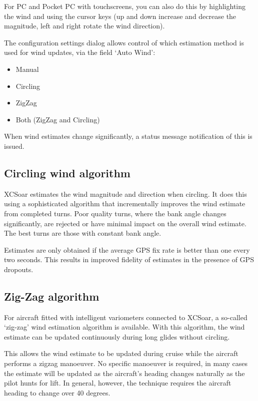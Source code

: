 For PC and Pocket PC with touchscreens, you can
also do this by highlighting the wind {\InfoBox} and using the cursor
keys (up and down increase and decrease the magnitude, left and right
rotate the wind direction).

The configuration  settings dialog allows control of which
estimation method is used for wind updates, via the field `Auto Wind':
\begin{itemize}
\item Manual
\item Circling
\item ZigZag
\item Both (ZigZag and Circling)
\end{itemize}

When wind estimates change significantly, a status message
notification of this is issued.

\subsection*{Circling wind algorithm}

XCSoar estimates the wind magnitude and direction when circling.  It
does this using a sophisticated algorithm that incrementally improves
the wind estimate from completed turns.  Poor quality turns, where
the bank angle changes significantly, are rejected or have minimal
impact on the overall wind estimate.  The best turns are those with
constant bank angle.

Estimates are only obtained if the average GPS fix rate is better than
one every two seconds.  This results in improved fidelity of estimates
in the presence of GPS dropouts.


\subsection*{Zig-Zag algorithm}

For aircraft fitted with intelligent variometers connected to XCSoar,
a so-called `zig-zag' wind estimation algorithm is available.  With
this algorithm, the wind estimate can be updated continuously during
long glides without circling.

This allows the wind estimate to be updated during cruise while the
aircraft performs a zigzag manoeuver.  No specific manoeuver is
required, in many cases the estimate will be updated as the aircraft's
heading changes naturally as the pilot hunts for lift.  In general,
however, the technique requires the aircraft heading to change over 40
degrees.

